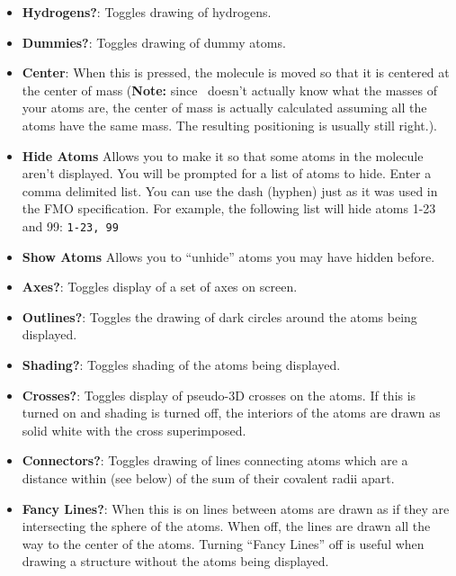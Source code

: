 \begin{itemize}
\item {\bf Hydrogens?}: Toggles drawing of hydrogens.

\item {\bf Dummies?}: Toggles drawing of dummy atoms.

\item {\bf Center}:  When this is pressed, the molecule is moved so
that it is centered at the center of mass ({\bf Note:} since
\viewprog\ doesn't actually know what the masses of your atoms are,
the center of mass is actually calculated assuming all the atoms have
the same mass.  The resulting positioning is usually still right.).


\item {\bf Hide Atoms} Allows you to make it so that some atoms in the
molecule aren't displayed.  You will be prompted for a list of atoms
to hide.  Enter a comma delimited list. You can use the dash (hyphen)
just as it was used in the FMO specification.  For example, the
following list will hide atoms 1-23 and 99:
{\tt 1-23, 99}

\item {\bf Show Atoms} Allows you to ``unhide'' atoms you may have hidden
before. 

\item {\bf Axes?}: Toggles display of a set of axes on screen.

\item {\bf Outlines?}: Toggles the drawing of dark circles around
the atoms being displayed.

\item {\bf Shading?}: Toggles shading of the atoms being displayed.

\item {\bf Crosses?}: Toggles display of pseudo-3D crosses on the
atoms.  If this is turned on and shading is turned off, the interiors
of the atoms are drawn as solid white with the cross superimposed.

\item {\bf Connectors?}: Toggles drawing of lines connecting atoms
which are a distance within  (see below) of the sum of
their covalent radii apart.

\item {\bf Fancy Lines?}: When this is on lines between atoms are
drawn as if they are intersecting the sphere of the atoms.  When off,
the lines are drawn all the way to the center of the atoms.  Turning
``Fancy Lines'' off is useful when drawing a structure without the
atoms being displayed.


\end{itemize}
